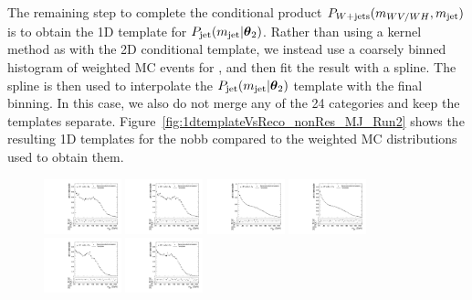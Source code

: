 The remaining step to complete the conditional product $P_{W+\text{jets}}(m_{WV/WH},m_\mathrm{jet})$ is to obtain the 1D template for $P_\mathrm{jet}(m_\mathrm{jet}|\vb*{\theta}_2)$.
Rather than using a kernel method as with the 2D conditional template, we instead use a coarsely binned histogram of weighted MC events for \MJ, and then fit the result with a spline.
The spline is then used to interpolate the $P_\mathrm{jet}(m_\mathrm{jet}|\vb*{\theta}_2)$ template with the final \MJ binning.
In this case, we also do not merge any of the 24 categories and keep the templates separate.
Figure~\ref{fig:1dtemplateVsReco_nonRes_MJ_Run2} shows the resulting 1D templates for the nobb compared to the weighted MC distributions used to obtain them.

\begin{figure}[htbp]
  \centering
  \includegraphics[width=0.2\textwidth]{fig/2Dfit/templateVsReco_nonRes_r0_MJ_mu_HP_nobb_LDy.pdf}
  \includegraphics[width=0.2\textwidth]{fig/2Dfit/templateVsReco_nonRes_r0_MJ_e_HP_nobb_LDy.pdf}
  \includegraphics[width=0.2\textwidth]{fig/2Dfit/templateVsReco_nonRes_r0_MJ_mu_LP_nobb_LDy.pdf}
  \includegraphics[width=0.2\textwidth]{fig/2Dfit/templateVsReco_nonRes_r0_MJ_e_LP_nobb_LDy.pdf}\\
  \includegraphics[width=0.2\textwidth]{fig/2Dfit/templateVsReco_nonRes_r0_MJ_mu_HP_nobb_HDy.pdf}
  \includegraphics[width=0.2\textwidth]{fig/2Dfit/templateVsReco_nonRes_r0_MJ_e_HP_nobb_HDy.pdf}

\end{figure}
